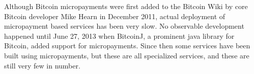 Although Bitcoin micropayments were first added to the Bitcoin Wiki by core Bitcoin developer Mike Hearn in December 2011,  actual deployment of micropayment based services has been very slow. No observable development happened until June 27, 2013 when BitcoinJ, a prominent java library for Bitcoin, added support for micropayments. Since then some services have been built using micropayments, but these are all specialized services, and these are still very few in number.
